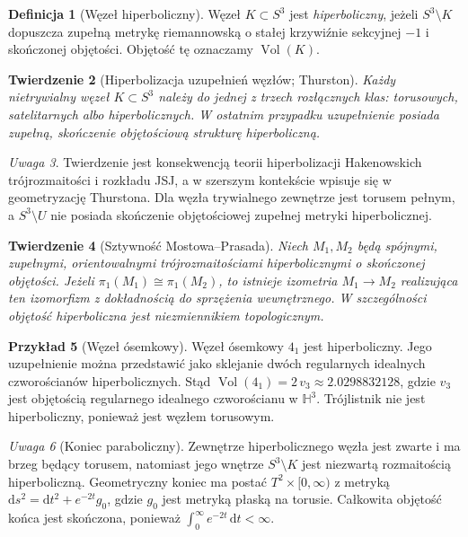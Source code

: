 \documentclass[11pt,a4paper]{report}
\numberwithin{equation}{section}
\theoremstyle{plain}
\newtheorem{twierdzenie}{Twierdzenie}[section]
\theoremstyle{definition}
\newtheorem{definicja}[twierdzenie]{Definicja}
\newtheorem{przyklad}[twierdzenie]{Przykład}
\theoremstyle{remark}
\newtheorem{uwaga}[twierdzenie]{Uwaga}
\begin{document}
\begin{definicja}[Węzeł hiperboliczny]
Węzeł $K\subset S^3$ jest \emph{hiperboliczny}, jeżeli
$S^3\setminus K$ dopuszcza zupełną metrykę riemannowską
o stałej krzywiźnie sekcyjnej $-1$ i skończonej objętości.
Objętość tę oznaczamy $\operatorname{Vol}(K)$.
\end{definicja}

\begin{twierdzenie}[Hiperbolizacja uzupełnień węzłów; Thurston]
Każdy nietrywialny węzeł $K\subset S^3$ należy do jednej
z trzech rozłącznych klas: torusowych, satelitarnych albo
hiperbolicznych. W ostatnim przypadku uzupełnienie posiada
zupełną, skończenie objętościową strukturę hiperboliczną.
\end{twierdzenie}

\begin{uwaga}
Twierdzenie jest konsekwencją teorii hiperbolizacji
Hakenowskich trójrozmaitości i rozkładu JSJ, a w szerszym
kontekście wpisuje się w geometryzację Thurstona.
Dla węzła trywialnego zewnętrze jest torusem pełnym,
a $S^3\setminus U$ nie posiada skończenie objętościowej
zupełnej metryki hiperbolicznej.
\end{uwaga}

\begin{twierdzenie}[Sztywność Mostowa--Prasada]
Niech $M_1,M_2$ będą spójnymi, zupełnymi, orientowalnymi
trójrozmaitościami hiperbolicznymi o skończonej objętości.
Jeżeli $\pi_1(M_1)\cong\pi_1(M_2)$, to istnieje izometria
$M_1\to M_2$ realizująca ten izomorfizm z dokładnością
do sprzężenia wewnętrznego. W szczególności objętość
hiperboliczna jest niezmiennikiem topologicznym.
\end{twierdzenie}

\begin{przyklad}[Węzeł ósemkowy]
Węzeł ósemkowy $4_1$ jest hiperboliczny. Jego uzupełnienie
można przedstawić jako sklejanie dwóch regularnych idealnych
czworościanów hiperbolicznych. Stąd
$\operatorname{Vol}(4_1)=2\,v_3\approx2.0298832128$,
gdzie $v_3$ jest objętością regularnego idealnego
czworościanu w $\mathbb H^3$. Trójlistnik nie jest
hiperboliczny, ponieważ jest węzłem torusowym.
\end{przyklad}

\begin{uwaga}[Koniec paraboliczny]
Zewnętrze hiperbolicznego węzła jest zwarte i ma brzeg
będący torusem, natomiast jego wnętrze $S^3\setminus K$
jest niezwartą rozmaitością hiperboliczną. Geometryczny
koniec ma postać $T^2\times[0,\infty)$ z metryką
$\mathrm ds^2=\mathrm dt^2+e^{-2t}g_0$,
gdzie $g_0$ jest metryką płaską na torusie.
Całkowita objętość końca jest skończona, ponieważ
$\int_0^\infty e^{-2t}\,\mathrm dt<\infty$.
\end{uwaga}
\end{document}
